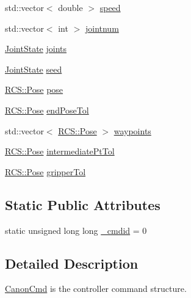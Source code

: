 \begin{DoxyCompactItemize}
\item 
std\-::vector$<$ double $>$ \hyperlink{structRCS_1_1CanonCmd_aa31954bd04399469490123786ee17496}{speed}
\item 
std\-::vector$<$ int $>$ \hyperlink{structRCS_1_1CanonCmd_a1fb8395cab4ebddddafd37e7387f9ff8}{jointnum}
\item 
\hyperlink{RCS_8h_aa4adb93a26caa4dacba9c9614e283245}{Joint\-State} \hyperlink{structRCS_1_1CanonCmd_aca799c5c818f28f0d9f4797b325b03de}{joints}
\item 
\hyperlink{RCS_8h_aa4adb93a26caa4dacba9c9614e283245}{Joint\-State} \hyperlink{structRCS_1_1CanonCmd_a577caa222abd73e6490108c7aecbc61c}{seed}
\item 
\hyperlink{namespaceRCS_aa07e45d8a50e30064283d2b38087f999}{R\-C\-S\-::\-Pose} \hyperlink{structRCS_1_1CanonCmd_adc27ad3ae01d7aab1c9c92f08df82fc1}{pose}
\item 
\hyperlink{namespaceRCS_aa07e45d8a50e30064283d2b38087f999}{R\-C\-S\-::\-Pose} \hyperlink{structRCS_1_1CanonCmd_a11e66454d05007664d63cea7b35822c2}{end\-Pose\-Tol}
\item 
std\-::vector$<$ \hyperlink{namespaceRCS_aa07e45d8a50e30064283d2b38087f999}{R\-C\-S\-::\-Pose} $>$ \hyperlink{structRCS_1_1CanonCmd_a1f7fdffabe34bcb3f0afd42f60040648}{waypoints}
\item 
\hyperlink{namespaceRCS_aa07e45d8a50e30064283d2b38087f999}{R\-C\-S\-::\-Pose} \hyperlink{structRCS_1_1CanonCmd_a9b27fcbd1298ee6a95e412a68741ddfc}{intermediate\-Pt\-Tol}
\item 
\hyperlink{namespaceRCS_aa07e45d8a50e30064283d2b38087f999}{R\-C\-S\-::\-Pose} \hyperlink{structRCS_1_1CanonCmd_af76b1a60d2d7282d1a60863c907176de}{gripper\-Tol}
\end{DoxyCompactItemize}
\subsection*{Static Public Attributes}
\begin{DoxyCompactItemize}
\item 
static unsigned long long \hyperlink{structRCS_1_1CanonCmd_ae719b5ae5d58e75b652b27df76113010}{\-\_\-cmdid} = 0
\end{DoxyCompactItemize}


\subsection{Detailed Description}
\hyperlink{structRCS_1_1CanonCmd}{Canon\-Cmd} is the controller command structure. 


